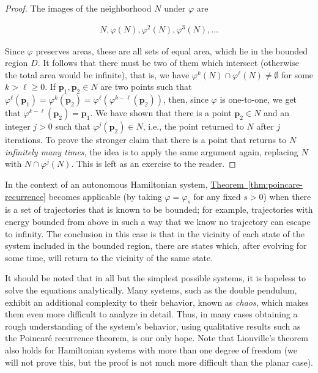 \documentclass[11pt]{report}
\theoremstyle{plain}
\theoremstyle{definition}
\begin{document}
\begin{proof}
The images of the neighborhood $N$ under $\varphi$ are

\begin{align*}
N, \varphi(N), \varphi^2(N), \varphi^3(N), \ldots
\end{align*}

\noindent Since $\varphi$ preserves areas, these are all sets of
equal area, which lie in the bounded region $D$. It
follows that there must be two of them which intersect
(otherwise the total area would be infinite), that is,
we have
$\varphi^k(N) \cap \varphi^\ell(N) \neq \emptyset$ for
some $k>\ell\ge 0$. If
$\mathbf{p}_1, \mathbf{p}_2 \in N$ are two points such
that
$\varphi^\ell(\mathbf{p}_1)=\varphi^k(\mathbf{p}_2)=\varphi^\ell(\varphi^{k-\ell}(\mathbf{p}_2))$,
then, since $\varphi$ is one-to-one, we get that
$\varphi^{k-\ell}(\mathbf{p}_2)=\mathbf{p}_1$. We have
shown that there is a point $\mathbf{p}_2\in N$ and an
integer $j>0$ such that
$\varphi^j(\mathbf{p}_2)\in N$, i.e., the point
returned to $N$ after $j$ iterations. To prove the
stronger claim that there is a point that returns to
$N$\emph{infinitely many times}, the idea is to apply the
same argument again, replacing $N$ with
$N\cap \varphi^j(N)$. This is left as an exercise to
the reader.
\end{proof}

\noindent In the context of an autonomous Hamiltonian system,
\hyperref[thm:poincare-recurrence]{Theorem~\ref*{thm:poincare-recurrence}} becomes applicable
(by taking $\varphi=\varphi_s$ for any fixed $s>0$)
when there is a set of trajectories that is known to
be bounded; for example, trajectories with energy
bounded from above in such a way that we know no
trajectory can escape to infinity. The conclusion in
this case is that in the vicinity of each state of the
system included in the bounded region, there are
states which, after evolving for some time, will
return to the vicinity of the same state.

It should be noted that in all but the simplest
possible systems, it is hopeless to solve the
equations analytically. Many systems, such as the
double pendulum, exhibit an additional complexity to
their behavior, known as \emph{chaos}, which makes them
even more difficult to analyze in detail. Thus, in
many cases obtaining a rough understanding of the
system's behavior, using qualitative results such as
the Poincaré recurrence theorem, is our only hope.
Note that Liouville's theorem also holds for
Hamiltonian systems with more than one degree of
freedom (we will not prove this, but the proof is not
much more difficult than the planar case).
\end{document}
